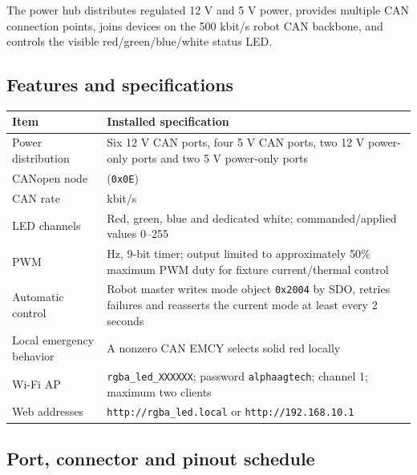 \documentclass[
  10pt,
  letterpaper,
  openany]{report}
\newcounter{none} %
\begin{document}
The power hub distributes regulated 12 V and 5 V power, provides
multiple CAN connection points, joins devices on the 500 kbit/s robot
CAN backbone, and controls the visible red/green/blue/white status LED.

\subsection{Features and
specifications}\label{features-and-specifications}

{\def\LTcaptype{none} %
\begin{longtable}[]{@{}
  >{\raggedright\arraybackslash}p{}
  >{\raggedright\arraybackslash}p{}@{}}
\toprule\noalign{}
\begin{minipage}[b]{\linewidth}\raggedright
Item
\end{minipage} & \begin{minipage}[b]{\linewidth}\raggedright
Installed specification
\end{minipage} \\
\midrule\noalign{}
\endhead
\bottomrule\noalign{}
\endlastfoot
Power distribution & Six 12 V CAN ports, four 5 V CAN ports, two 12 V
power-only ports and two 5 V power-only ports \\
CANopen node & 14 (\texttt{0x0E}) \\
CAN rate & 500 kbit/s \\
LED channels & Red, green, blue and dedicated white; commanded/applied
values 0--255 \\
PWM & 500 Hz, 9-bit timer; output limited to approximately 50\% maximum
PWM duty for fixture current/thermal control \\
Automatic control & Robot master writes mode object \texttt{0x2004} by
SDO, retries failures and reasserts the current mode at least every 2
seconds \\
Local emergency behavior & A nonzero CAN EMCY selects solid red
locally \\
Wi-Fi AP & \texttt{rgba\_led\_XXXXXX}; password \texttt{alphaagtech};
channel 1; maximum two clients \\
Web addresses & \texttt{http://rgba\_led.local} or
\texttt{http://192.168.10.1} \\
\end{longtable}
}

\subsection{Port, connector and pinout schedule}\label{power-hub-ports}
\end{document}
